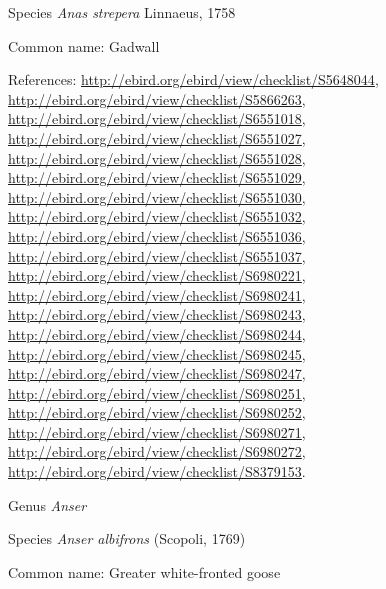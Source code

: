 \documentclass[9pt, article]{memoir}
\begin{document}
\begin{multicols}{2}
\vspace{6pt}\noindent\hspace{36pt}Species \textit{Anas strepera} Linnaeus, 1758


Common name: Gadwall

References: 
\url{http://ebird.org/ebird/view/checklist/S5648044}, 
\url{http://ebird.org/ebird/view/checklist/S5866263}, 
\url{http://ebird.org/ebird/view/checklist/S6551018}, 
\url{http://ebird.org/ebird/view/checklist/S6551027}, 
\url{http://ebird.org/ebird/view/checklist/S6551028}, 
\url{http://ebird.org/ebird/view/checklist/S6551029}, 
\url{http://ebird.org/ebird/view/checklist/S6551030}, 
\url{http://ebird.org/ebird/view/checklist/S6551032}, 
\url{http://ebird.org/ebird/view/checklist/S6551036}, 
\url{http://ebird.org/ebird/view/checklist/S6551037}, 
\url{http://ebird.org/ebird/view/checklist/S6980221}, 
\url{http://ebird.org/ebird/view/checklist/S6980241}, 
\url{http://ebird.org/ebird/view/checklist/S6980243}, 
\url{http://ebird.org/ebird/view/checklist/S6980244}, 
\url{http://ebird.org/ebird/view/checklist/S6980245}, 
\url{http://ebird.org/ebird/view/checklist/S6980247}, 
\url{http://ebird.org/ebird/view/checklist/S6980251}, 
\url{http://ebird.org/ebird/view/checklist/S6980252}, 
\url{http://ebird.org/ebird/view/checklist/S6980271}, 
\url{http://ebird.org/ebird/view/checklist/S6980272}, 
\url{http://ebird.org/ebird/view/checklist/S8379153}.

\vspace{6pt}\noindent\hspace{30pt}Genus \textit{Anser}


\vspace{6pt}\noindent\hspace{36pt}Species \textit{Anser albifrons} (Scopoli, 1769)


Common name: Greater white-fronted goose


\end{multicols}
\end{document}
